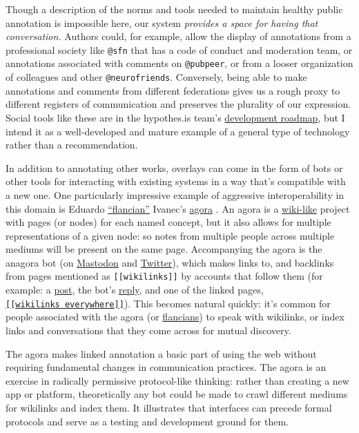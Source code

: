 Though a description of the norms and tools needed to maintain healthy
public annotation is impossible here, our system \emph{provides a space
for having that conversation.} Authors could, for example, allow the
display of annotations from a professional society like \texttt{@sfn}
that has a code of conduct and moderation team, or annotations
associated with comments on \texttt{@pubpeer}, or from a looser
organization of colleagues and other \texttt{@neurofriends}. Conversely,
being able to make annotations and comments from different federations
gives us a rough proxy to different registers of communication and
preserves the plurality of our expression. Social tools like these are
in the hypothes.is team's
\href{https://web.archive.org/web/20211015213849/https://github.com/hypothesis/product-backlog/projects/6}{development
roadmap}, but I intend it as a well-developed and mature example of a
general type of technology rather than a
recommendation.

In addition to annotating other works, overlays can come in the form of
bots or other tools for interacting with existing systems in a way
that's compatible with a new one. One particularly impressive example of
aggressive interoperability in this domain is Eduardo
\href{https://flancia.org/}{``flancian''} Ivanec's
\href{https://anagora.org/}{agora} \citep{ivanecFutureNoteTaking2021, velitchkovPersonalKnowledgeGraphs} . An agora is a
\href{https://anagora.org/wiki-like}{wiki-like} project with pages (or
nodes) for each named concept, but it also allows for multiple
representations of a given node: so notes from multiple people across
multiple mediums will be present on the same page. Accompanying the
agora is the anagora bot (on
\href{https://botsin.space/@agora}{Mastodon} and
\href{https://twitter.com/an_agora}{Twitter}), which makes links to, and
backlinks from pages mentioned as \texttt{{[}{[}wikilinks{]}{]}} by
accounts that follow them (for example: a
\href{https://social.coop/@jonny/108621001205679783}{post}, the bot's
\href{https://botsin.space/@agora/108621001318792297}{reply}, and one of
the linked pages,
\href{https://anagora.org/Wikilinks+Everywhere}{\texttt{{[}{[}wikilinks\ everywhere{]}{]}}}).
This becomes natural quickly: it's common for people associated with the
agora (or \href{https://flancia.org/manifesto/}{flancians}) to speak
with wikilinks, or index links and conversations that they come across
for mutual discovery.

The agora makes linked annotation a basic part of using the web without
requiring fundamental changes in communication practices. The agora is
an exercise in radically permissive protocol-like thinking: rather than
creating a new app or platform, theoretically any bot could be made to
crawl different mediums for wikilinks and index them. It illustrates
that interfaces can precede formal protocols and serve as a testing and
development ground for them.

